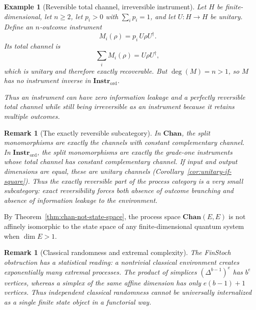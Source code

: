 \documentclass[11pt]{article}
\newtheorem{remark}[theorem]{Remark}
\newtheorem{example}[theorem]{Example}
\begin{document}
\begin{example}[Reversible total channel, irreversible instrument]
\label{ex:outcome-irreversibility}
Let $H$ be finite-dimensional, let $n\ge2$, let $p_i>0$ with
$\sum_i p_i=1$, and let $U:H\to H$ be unitary. Define an $n$-outcome
instrument
\[
M_i(\rho)=p_i\,U\rho U^\dagger.
\]
Its total channel is
\[
\sum_i M_i(\rho)=U\rho U^\dagger,
\]
which is unitary and therefore exactly recoverable. But $\deg(M)=n>1$, so
$M$ has no instrument inverse in $\mathbf{Instr}_{\mathrm{ord}}$.

Thus an instrument can have zero information leakage and a perfectly
reversible total channel while still being irreversible as an instrument
because it retains multiple outcomes.
\end{example}

\begin{remark}[The exactly reversible subcategory]
\label{rem:reversible-subcategory}
In $\mathbf{Chan}$, the split monomorphisms are exactly the channels with
constant complementary channel. In $\mathbf{Instr}_{\mathrm{ord}}$, the
split monomorphisms are exactly the grade-one instruments whose total
channel has constant complementary channel. If input and output dimensions
are equal, these are unitary channels
(Corollary~\ref{cor:unitary-if-square}). Thus the exactly reversible part
of the process category is a very small subcategory: exact reversibility
forces both absence of outcome branching and absence of information leakage
to the environment.
\end{remark}

By Theorem~\ref{thm:chan-not-state-space}, the process space
$\mathbf{Chan}(E,E)$ is not affinely isomorphic to the state space of any
finite-dimensional quantum system when $\dim E>1$.

\begin{remark}[Classical randomness and extremal complexity]
\label{rem:classical-extremal}
The FinStoch obstruction has a statistical reading: a nontrivial classical
environment creates exponentially many extremal processes. The product of
simplices $(\Delta^{b-1})^e$ has $b^e$ vertices, whereas a simplex of the
same affine dimension has only $e(b-1)+1$ vertices. Thus independent
classical randomness cannot be universally internalized as a single finite
state object in a functorial way.
\end{remark}
\end{document}
